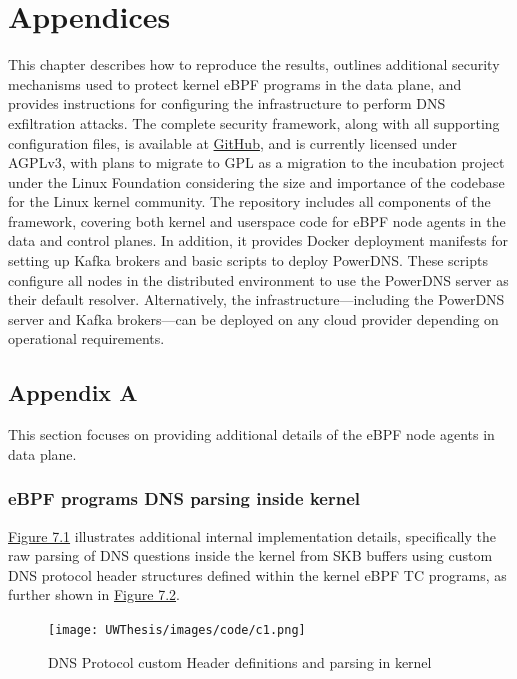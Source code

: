 \documentclass [11pt, proquest] {uwthesis}[2020/02/24]
\begin{document}
 





\chapter{Appendices}

This chapter describes how to reproduce the results, outlines additional security mechanisms used to protect kernel eBPF programs in the data plane, and provides instructions for configuring the infrastructure to perform DNS exfiltration attacks. The complete security framework, along with all supporting configuration files, is available at \href{https://github.com/Synarcs/DNSObelisk}{GitHub}, and is currently licensed under AGPLv3, with plans to migrate to GPL as a migration to the incubation project under the Linux Foundation considering the size and importance of the codebase for the Linux kernel community. The repository includes all components of the framework, covering both kernel and userspace code for eBPF node agents in the data and control planes. In addition, it provides Docker deployment manifests for setting up Kafka brokers and basic scripts to deploy PowerDNS. These scripts configure all nodes in the distributed environment to use the PowerDNS server as their default resolver. Alternatively, the infrastructure—including the PowerDNS server and Kafka brokers—can be deployed on any cloud provider depending on operational requirements.


\section{Appendix A}
This section focuses on providing additional details of the eBPF node agents in data plane.

\subsection{eBPF programs DNS parsing inside kernel}
\hyperref[fig:c1]{Figure 7.1} illustrates additional internal implementation details, specifically the raw parsing of DNS questions inside the kernel from SKB buffers using custom DNS protocol header structures defined within the kernel eBPF TC programs, as further shown in \hyperref[fig:c2]{Figure 7.2}.

\begin{figure}[H]
    \centering
    \texttt{[image: UWThesis/images/code/c1.png]}
    \caption{DNS Protocol custom Header definitions and parsing in kernel}
    \label{fig:c1}
\end{figure}
\end{document}
